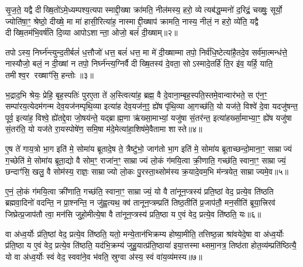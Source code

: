 सृ॒ज॒ते॒ यद्वै दीख्षि॒तो॑ऽमे॒ध्यम्पश्य॒त्यपास्माद्दी॒ख्षा क्रा॑मति॒ नील॑मस्य॒ हरो॒ व्येत्यब॑द्ध॒म्मनो॑ द॒रिद्रं॒ चख्षुः॒ सूर्यो॒ ज्योति॑षा॒ꣳ॒ श्रेष्ठो॒ दीख्षे॒ मा मा॑ हासी॒रित्या॑ह॒ नास्माद्दी॒ख्षाप॑ क्रामति॒ नास्य॒ नीलं॒ न हरो॒ व्ये॑ति॒ यद्वै दीख्षि॒तम॑भि॒वर्\mbox{}ष॑ति दि॒व्या आपोऽशान्ता॒ ओजो॒ बलं॑ दी॒ख्षाम्॥२॥

तपोऽस्य॒ निर्घ्न॑न्त्युन्द॒तीर्बलं॑ ध॒त्तौजो॑ धत्त॒ बलं॑ धत्त॒ मा मे॑ दी॒ख्षाम्मा तपो॒ निर्व॑धि॒ष्टेत्या॑है॒तदे॒व सर्व॑मा॒त्मन्ध॑त्ते॒ नास्यौजो॒ बलं॒ न दी॒ख्षां न तपो॒ निर्घ्न॑न्त्य॒ग्निर्वै दीख्षि॒तस्य॑ दे॒वता॒ सोऽस्मादे॒तर्\mbox{}हि॑ ति॒र इ॑व॒ यर्\mbox{}हि॒ याति॒ तमीश्व॒र रख्षाꣳ॑सि॒ हन्तोः॥३॥

भ॒द्राद॒भि श्रेयः॒ प्रेहि॒ बृह॒स्पतिः॑ पुरए॒ता ते॑ अ॒स्त्वित्या॑ह॒ ब्रह्म॒ वै दे॒वाना॒म्बृह॒स्पति॒स्तमे॒वान्वार॑भते॒ स ए॑न॒ꣳ॒ सम्पा॑रय॒त्येदम॑गन्म देव॒यज॑नम्पृथि॒व्या इत्या॑ह देव॒यज॑न॒ꣵ॒ ह्ये॑ष पृ॑थि॒व्या आ॒गच्छ॑ति॒ यो यज॑ते॒ विश्वे॑ दे॒वा यदजु॑षन्त॒ पूर्व॒ इत्या॑ह॒ विश्वे॒ ह्ये॑तद्दे॒वा जो॒षय॑न्ते॒ यद्ब्राह्म॒णा ऋ॑ख्सा॒माभ्यां॒ यजु॑षा सं॒तर॑न्त॒ इत्या॑हर्ख्सा॒माभ्या॒ꣳ॒ ह्ये॑ष यजु॑षा सं॒तर॑ति॒ यो यज॑ते रा॒यस्पोषे॑ण॒ समि॒षा म॑दे॒मेत्या॑हा॒शिष॑मे॒वैतामा शास्ते॥४॥

{\anuvakamend[{यज॑मानो दी॒ख्षा हन्तोर्ब्राह्म॒णाश्चतु॑र्विशतिश्च॥१॥}]}

ए॒ष ते॑ गाय॒त्रो भा॒ग इति॑ मे॒ सोमा॑य ब्रूतादे॒ष ते॒ त्रैष्टु॑भो॒ जाग॑तो भा॒ग इति॑ मे॒ सोमा॑य ब्रूताच्छन्दो॒माना॒ꣳ॒ साम्राज्यं ग॒च्छेति॑ मे॒ सोमा॑य ब्रूता॒द्यो वै सोम॒ꣳ॒ राजा॑न॒ꣳ॒ साम्राज्यं लो॒कं ग॑मयि॒त्वा क्री॒णाति॒ गच्छ॑ति॒ स्वाना॒ꣳ॒ साम्राज्यं॒ छन्दाꣳ॑सि॒ खलु॒ वै सोम॑स्य॒ राज्ञः॒ साम्राज्यो लो॒कः पु॒रस्ता॒थ्सोम॑स्य क्र॒यादे॒वम॒भि म॑न्त्रयेत॒ साम्राज्यमे॒व॥५॥

ए॒नं॒ लो॒कं ग॑मयि॒त्वा क्री॑णाति॒ गच्छ॑ति॒ स्वाना॒ꣳ॒ साम्राज्यं॒ यो वै ता॑नून॒प्त्रस्य॑ प्रति॒ष्ठां वेद॒ प्रत्ये॒व ति॑ष्ठति ब्रह्मवा॒दिनो॑ वदन्ति॒ न प्रा॒श्नन्ति॒ न जु॑ह्व॒त्यथ॒ क्व॑ तानून॒प्त्रम्प्रति॑ तिष्ठ॒तीति॑ प्र॒जाप॑तौ॒ मन॒सीति॑ ब्रूया॒त्त्रिरव॑ जिघ्रेत्प्र॒जाप॑तौ त्वा॒ मन॑सि जुहो॒मीत्ये॒षा वै ता॑नून॒प्त्रस्य॑ प्रति॒ष्ठा य ए॒वं वेद॒ प्रत्ये॒व ति॑ष्ठति॒ यः॥६॥

वा अ॑ध्व॒र्योः प्र॑ति॒ष्ठां वेद॒ प्रत्ये॒व ति॑ष्ठति॒ यतो॒ मन्ये॒तान॑भिक्रम्य होष्या॒मीति॒ तत्तिष्ठ॒न्ना श्रा॑वयेदे॒षा वा अ॑ध्व॒र्योः प्र॑ति॒ष्ठा य ए॒वं वेद॒ प्रत्ये॒व ति॑ष्ठति॒ यद॑भि॒क्रम्य॑ जुहु॒यात्प्र॑ति॒ष्ठाया॑ इया॒त्तस्माथ्समा॒नत्र॒ तिष्ठ॑ता होत॒व्य॑म्प्रति॑ष्ठित्यै॒ यो वा अ॑ध्व॒र्योः स्वं वेद॒ स्ववा॑ने॒व भ॑वति॒ स्रुग्वा अ॑स्य॒ स्वं वा॑य॒व्य॑मस्य॥७॥

